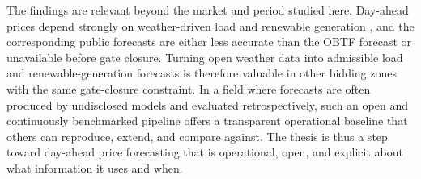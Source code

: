 The findings are relevant beyond the market and period studied here. Day-ahead
prices depend strongly on weather-driven load and renewable generation
\cite{sensfuss2008meritOrder,pape2016fundamentals}, and the corresponding public
forecasts are either less accurate than the OBTF forecast or unavailable before
gate closure. Turning open weather data into admissible load and
renewable-generation forecasts is therefore valuable in other bidding zones with
the same gate-closure constraint. In a field where forecasts are often produced by
undisclosed models and evaluated retrospectively, such an open and continuously
benchmarked pipeline offers a transparent operational baseline that others can
reproduce, extend, and compare against. The thesis is thus a step toward
day-ahead price forecasting that is operational, open, and explicit about what
information it uses and when.

